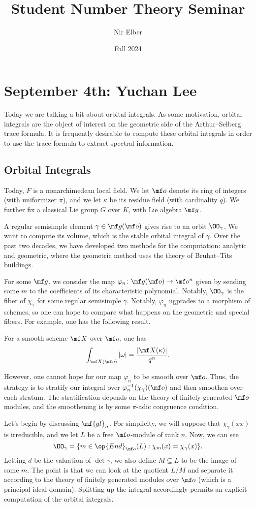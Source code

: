 \documentclass{article}
\title{Student Number Theory Seminar}
\author{Nir Elber}
\date{Fall 2024}
\begin{document}
\maketitle

\tableofcontents

\section{September 4th: Yuchan Lee}
Today we are talking a bit about orbital integrals. As some motivation, orbital integrals are the object of interest on the geometric side of the Arthur--Selberg trace formula. It is frequently desirable to compute these orbital integrals in order to use the trace formula to extract spectral information.

\subsection{Orbital Integrals}
Today, $F$ is a nonarchimedean local field. We let $\mf o$ denote its ring of integers (with uniformizer $\pi$), and we let $\kappa$ be its residue field (with cardinality $q$). We further fix a classical Lie group $G$ over $K$, with Lie algebra $\mf g$.

A regular semisimple element $\gamma\in\mf g(\mf o)$ gives rise to an orbit $\OO_\gamma$. We want to compute its volume, which is the stable orbital integral of $\gamma$. Over the past two decades, we have developed two methods for the computation: analytic and geometric, where the geometric method uses the theory of Bruhat--Tits buildings.

For some $\mf g$, we consider the map $\varphi_n\colon\mf g(\mf o)\to\mf o^n$ given by sending some $m$ to the coefficients of its characteristic polynomial. Notably, $\OO_\gamma$ is the fiber of $\chi_\gamma$ for some regular semisimple $\gamma$. Notably, $\varphi_n$ ugprades to a morphism of schemes, so one can hope to compare what happens on the geometric and special fibers. For example, one has the following result.
\begin{theorem}[Weil]
	For a smooth scheme $\mf X$ over $\mf o$, one has
	\[\int_{\mf X(\mf o)}\left|\omega\right|=\frac{\left|\mf X(\kappa)\right|}{q^n}.\]
\end{theorem}
However, one cannot hope for our map $\varphi_n$ to be smooth over $\mf o$. Thus, the strategy is to stratify our integral over $\varphi_n^{-1}(\chi_\gamma)(\mf o)$ and then smoothen over each stratum. The stratification depends on the theory of finitely generated $\mf o$-modules, and the smoothening is by some $\pi$-adic congruence condition.

Let's begin by discussing $\mf{gl}_n$. For simplicity, we will suppose that $\chi_\gamma(xx)$ is irreducible, and we let $L$ be a free $\mf o$-module of rank $n$. Now, we can see
\[\OO_\gamma=\{m\in\op{End}_{\mf o}(L):\chi_m(x)=\chi_\gamma(x)\}.\]
Letting $d$ be the valuation of $\det\gamma$, we also define $M\subseteq L$ to be the image of some $m$. The point is that we can look at the quotient $L/M$ and separate it according to the theory of finitely generated modules over $\mf o$ (which is a principal ideal domain). Splitting up the integral accordingly permits an explicit computation of the orbital integrals.
\end{document}
